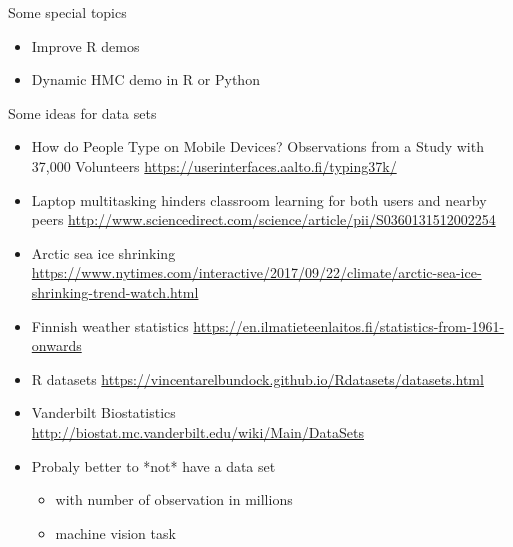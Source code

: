 \documentclass[t]{beamer}
\begin{document}
\begin{frame}
  
  {\Large\color{navyblue} Some special topics}

  \begin{itemize}
  \item Improve R demos
  \item Dynamic HMC demo in R or Python
  \end{itemize}
  
\end{frame}

\begin{frame}
  
  {\Large\color{navyblue} Some ideas for data sets}
  
  \begin{itemize}
  \item How do People Type on Mobile Devices? Observations from a
    Study with 37,000 Volunteers \url{https://userinterfaces.aalto.fi/typing37k/}
  \item Laptop multitasking hinders classroom learning for both users
    and nearby peers
    \url{http://www.sciencedirect.com/science/article/pii/S0360131512002254}
  \item Arctic sea ice shrinking \url{https://www.nytimes.com/interactive/2017/09/22/climate/arctic-sea-ice-shrinking-trend-watch.html}
  \item Finnish weather statistics \url{https://en.ilmatieteenlaitos.fi/statistics-from-1961-onwards}
  \item R datasets \url{https://vincentarelbundock.github.io/Rdatasets/datasets.html}
  \item Vanderbilt Biostatistics \url{http://biostat.mc.vanderbilt.edu/wiki/Main/DataSets}
  \item Probaly better to *not* have a data set
    \begin{itemize}
    \item with number of observation in millions
    \item machine vision task
    \end{itemize}
  \end{itemize}
\end{frame}
\end{document}
